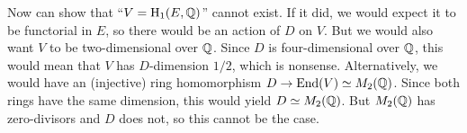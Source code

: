 \documentclass{article}
\begin{document}
Now can show that ``$V=\operatorname{H}_1(E,\mathbb{Q})$'' cannot exist. If it did, we would expect 
it to be functorial in $E$, so there would be an action of $D$ on $V$. But we 
would also want $V$ to be two-dimensional over $\mathbb{Q}$. Since $D$ is 
four-dimensional over $\mathbb{Q}$, this would mean that $V$ has $D$-dimension $1/2$, 
which is nonsense. Alternatively, we would have an (injective) ring 
homomorphism $D\to \operatorname{End}(V)\simeq M_2(\mathbb{Q})$. Since both rings have the same 
dimension, this would yield $D\simeq M_2(\mathbb{Q})$. But $M_2(\mathbb{Q})$ has 
zero-divisors and $D$ does not, so this cannot be the case. 












\end{document}
